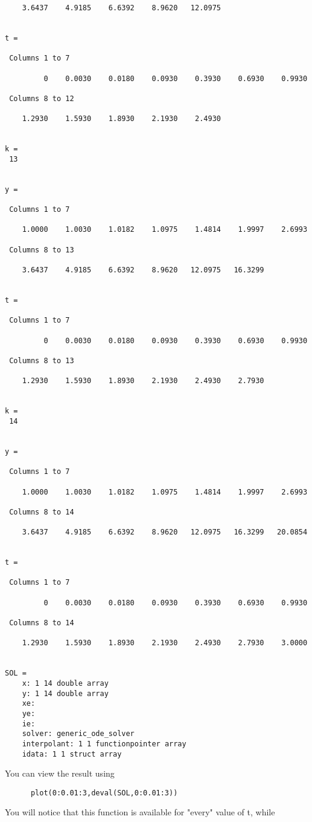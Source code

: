 \begin{verbatim}
    3.6437    4.9185    6.6392    8.9620   12.0975 


t = 

 Columns 1 to 7

         0    0.0030    0.0180    0.0930    0.3930    0.6930    0.9930 

 Columns 8 to 12

    1.2930    1.5930    1.8930    2.1930    2.4930 


k = 
 13 


y = 

 Columns 1 to 7

    1.0000    1.0030    1.0182    1.0975    1.4814    1.9997    2.6993 

 Columns 8 to 13

    3.6437    4.9185    6.6392    8.9620   12.0975   16.3299 


t = 

 Columns 1 to 7

         0    0.0030    0.0180    0.0930    0.3930    0.6930    0.9930 

 Columns 8 to 13

    1.2930    1.5930    1.8930    2.1930    2.4930    2.7930 


k = 
 14 


y = 

 Columns 1 to 7

    1.0000    1.0030    1.0182    1.0975    1.4814    1.9997    2.6993 

 Columns 8 to 14

    3.6437    4.9185    6.6392    8.9620   12.0975   16.3299   20.0854 


t = 

 Columns 1 to 7

         0    0.0030    0.0180    0.0930    0.3930    0.6930    0.9930 

 Columns 8 to 14

    1.2930    1.5930    1.8930    2.1930    2.4930    2.7930    3.0000 


SOL = 
    x: 1 14 double array
    y: 1 14 double array
    xe: 
    ye: 
    ie: 
    solver: generic_ode_solver
    interpolant: 1 1 functionpointer array
    idata: 1 1 struct array
\end{verbatim}
 You can view the result using
\begin{verbatim}
      plot(0:0.01:3,deval(SOL,0:0.01:3))
\end{verbatim}
 You will notice that this function is available for "every" value of t, while

